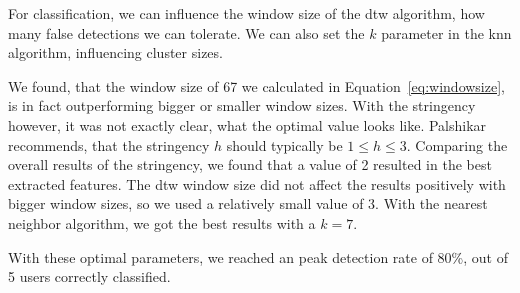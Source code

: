 For classification, we can influence the window size of the \gls{dtw} algorithm, \ie how many false detections we can tolerate. We can also set the $k$ parameter in the \gls{knn} algorithm, influencing cluster sizes.

We found, that the window size of \num{67} we calculated in Equation~\ref{eq:windowsize}, is in fact outperforming bigger or smaller window sizes. With the stringency however, it was not exactly clear, what the optimal value looks like. Palshikar \cite{palshikar2009simple} recommends, that the stringency $h$ should typically be $1 \leq h \leq 3$. Comparing the overall results of the stringency, we found that a value of 2 resulted in the best extracted features. The \gls{dtw} window size did not affect the results positively with bigger window sizes, so we used a relatively small value of 3. With the nearest neighbor algorithm, we got the best results with a $k = 7$.

With these optimal parameters, we reached an peak detection rate of 80\%,  out of 5 users correctly classified.